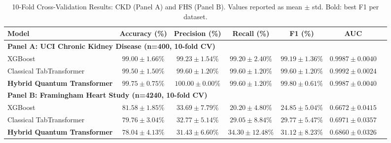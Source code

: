 \begin{table}[ht]
\centering
\caption{10-Fold Cross-Validation Results: CKD (Panel A) and FHS (Panel B). Values reported as mean $\pm$ std. Bold: best F1 per dataset.}
\label{tab:dual_results}
\begin{tabular}{lcccccc}
\toprule
Model & Accuracy (\%) & Precision (\%) & Recall (\%) & F1 (\%) & AUC \\
\midrule
\multicolumn{6}{l}{\textbf{Panel A: UCI Chronic Kidney Disease (n=400, 10-fold CV)}} \\
\midrule
XGBoost & $99.00 \pm 1.66\%$ & $99.23 \pm 1.54\%$ & $99.20 \pm 2.40\%$ & $99.19 \pm 1.36\%$ & $0.9987 \pm 0.0040$ \\
Classical TabTransformer & $99.50 \pm 1.50\%$ & $99.60 \pm 1.20\%$ & $99.60 \pm 1.20\%$ & $99.60 \pm 1.20\%$ & $0.9992 \pm 0.0024$ \\
\textbf{Hybrid Quantum Transformer} & \textbf{$99.75 \pm 0.75\%$} & \textbf{$100.00 \pm 0.00\%$} & \textbf{$99.60 \pm 1.20\%$} & \textbf{$99.80 \pm 0.61\%$} & \textbf{$0.9987 \pm 0.0040$} \\
\midrule
\multicolumn{6}{l}{\textbf{Panel B: Framingham Heart Study (n=4240, 10-fold CV)}} \\
\midrule
XGBoost & $81.58 \pm 1.85\%$ & $33.69 \pm 7.79\%$ & $20.20 \pm 4.80\%$ & $24.85 \pm 5.04\%$ & $0.6672 \pm 0.0415$ \\
Classical TabTransformer & $79.76 \pm 3.04\%$ & $32.77 \pm 5.14\%$ & $29.05 \pm 8.84\%$ & $29.77 \pm 5.47\%$ & $0.6971 \pm 0.0357$ \\
\textbf{Hybrid Quantum Transformer} & \textbf{$78.04 \pm 4.13\%$} & \textbf{$31.43 \pm 6.60\%$} & \textbf{$34.30 \pm 12.48\%$} & \textbf{$31.12 \pm 8.23\%$} & \textbf{$0.6860 \pm 0.0326$} \\
\bottomrule
\end{tabular}
\end{table}